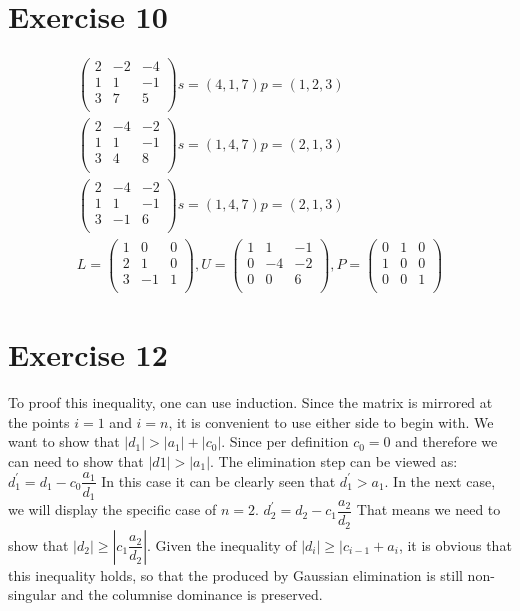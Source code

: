 \section{Exercise 10}
\begin{gather*}
\left( \begin{array}{ccc}
2 & -2 & -4 \\
1 & 1 & -1 \\
3 & 7 & 5 \\
\end{array} \right)
s = ( 4 , 1 , 7 )
p = ( 1 , 2 , 3 )
\\
\left( \begin{array}{ccc}
2 & -4 & -2 \\
1 & 1 & -1 \\
3 & 4 & 8 \\
\end{array} \right)
s = ( 1 , 4 ,7 )
p = ( 2 , 1 , 3 ) \\
\left( \begin{array}{ccc}
2 & -4 & -2 \\
1 & 1 & -1 \\
3 & -1 & 6 \\
\end{array} \right)
s = ( 1 , 4 , 7 )
p = ( 2 , 1 , 3 )\\
L = \left( \begin{array}{ccc}
1 & 0 & 0 \\
2 & 1 & 0 \\
3 & -1 & 1 \\
\end{array} \right),
U = \left( \begin{array}{ccc}
1 & 1 & -1 \\
0 & -4 & -2 \\
0 & 0 & 6 \\
\end{array} \right),
P = \left( \begin{array}{ccc}
0 & 1 & 0 \\
1 & 0 & 0 \\
0 & 0 & 1 \\
\end{array} \right)
\end{gather*}

\section{Exercise 12}

To proof this inequality, one can use induction. Since the matrix is mirrored at the points $i=1$ and $i=n$, it is convenient to use either side to begin with.
We want to show that $|d_{1}| > |a_{1}| + |c_{0}| $. Since per definition $ c_0 = 0$ and therefore we can need to show that $|d{1}| > |a_{1}|$.
The elimination step can be viewed as:
$d_{1}^{'} = d_{1} - c_0 \dfrac{a_1}{d_1} $
In this case it can be clearly seen that $d_{1}^{'} > a_{1}$. In the next case, we will display the specific case of $n=2$.
$d_{2}^{'} = d_{2} - c_1 \dfrac{a_2}{d_2} $
That means we need to show that $|d_2| \geq |c_1 \dfrac{a_2}{d_2}|$. Given the inequality of $|d_i| \geq |c_{i-1} + a_i$, it is obvious that this inequality holds, so that the  produced by Gaussian elimination is still non-singular and the columnise dominance is preserved.

